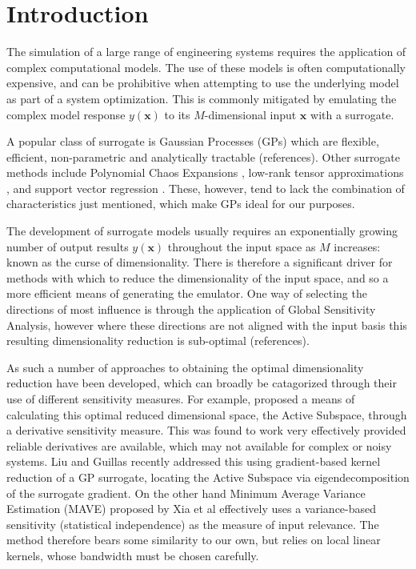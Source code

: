 \documentclass[preprint,12pt]{elsarticle}
\newcommand*{\M}[1]{\ensuremath{#1}\xspace}
\newcommand*{\vr}[1]{\M{\mathbf{#1}}}
\begin{document}

    \section{Introduction} \label{sec:Intro}
        The simulation of a large range of engineering systems requires the application of complex computational models. The use of these models is often computationally expensive, and can be prohibitive when attempting to use the underlying model as part of a system optimization. This is commonly mitigated by emulating the complex model response $y(\vr{x})$ to its \M{M}-dimensional input $\vr{x}$ with a surrogate. 
        
        A popular class of surrogate is Gaussian Processes (GPs) \cite{Sacks.etal1989, Rasmussen.Williams2005} which are flexible, efficient, non-parametric and analytically tractable (references). Other surrogate methods include Polynomial Chaos Expansions \cite{Ghanem.Spanos1997,Xiu.Karniadakis2002,Xiu2010}, low-rank tensor approximations \cite{Chevreuil.etal2015,Konakli.Sudret2016}, and support vector regression \cite{Cortes.Vapnik1995}.
        These, however, tend to lack the combination of characteristics just mentioned, which make GPs ideal for our purposes.
        
        The development of surrogate models usually requires an exponentially growing number of output results $y(\vr{x})$ throughout the input space as \M{M} increases: known as the curse of dimensionality. There is therefore a significant driver for methods with which to reduce the dimensionality of the input space, and so a more efficient means of generating the emulator. One way of selecting the directions of most influence is through the application of Global Sensitivity Analysis, however where these directions are not aligned with the input basis this resulting dimensionality reduction is sub-optimal (references).
        
        As such a number of approaches to obtaining the optimal dimensionality reduction have been developed, which can broadly be catagorized through their use of different sensitivity measures. For example, \cite{Constantine.etal2014} proposed a means of calculating this optimal reduced dimensional space, the Active Subspace, through a derivative sensitivity measure. This was found to work very effectively provided reliable derivatives are available, which may not available for complex or noisy systems. Liu and Guillas \cite{Liu.Guillas2017} recently addressed this using gradient-based kernel reduction of a GP surrogate, locating the Active Subspace via eigendecomposition of the surrogate gradient.
        On the other hand Minimum Average Variance Estimation (MAVE) proposed by Xia et al \cite{Xia.etal2002} effectively uses a variance-based sensitivity (statistical independence) as the measure of input relevance. The method therefore bears some similarity to our own, but relies on local linear kernels, whose bandwidth must be chosen carefully.
         
\end{document}
